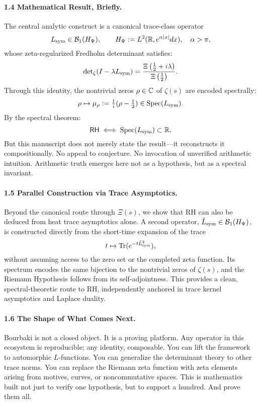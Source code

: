 \paragraph*{1.4 Mathematical Result, Briefly.}
The central analytic construct is a canonical trace-class operator
\[
L_{\mathrm{sym}} \in \mathcal{B}_1(H_{\Psi}), \qquad H_{\Psi} := L^2(\mathbb{R}, e^{\alpha|x|} dx), \quad \alpha > \pi,
\]
whose zeta-regularized Fredholm determinant satisfies:
\[
\det\nolimits_{\zeta}(I - \lambda L_{\mathrm{sym}}) = \frac{\Xi\left(\tfrac{1}{2} + i\lambda\right)}{\Xi\left(\tfrac{1}{2}\right)}.
\]
Through this identity, the nontrivial zeros \( \rho \in \mathbb{C} \) of \( \zeta(s) \) are encoded spectrally:
\[
\rho \mapsto \mu_\rho := \tfrac{1}{i}(\rho - \tfrac{1}{2}) \in \operatorname{Spec}(L_{\mathrm{sym}}).
\]
By the spectral theorem:
\[
\mathsf{RH} \iff \operatorname{Spec}(L_{\mathrm{sym}}) \subset \mathbb{R}.
\]
But this manuscript does not merely state the result—it reconstructs it compositionally. No appeal to conjecture. No invocation of unverified arithmetic intuition. Arithmetic truth emerges here not as a hypothesis, but as a spectral invariant.

\paragraph*{1.5 Parallel Construction via Trace Asymptotics.}
Beyond the canonical route through \( \Xi(s) \), we show that RH can also be deduced from heat trace asymptotics alone. A second operator, \( \tilde{L}_{\mathrm{sym}} \in \mathcal{B}_1(H_{\Psi}) \), is constructed directly from the short-time expansion of the trace
\[
t \mapsto \operatorname{Tr}(e^{-t \tilde{L}_{\mathrm{sym}}^2}),
\]
without assuming access to the zero set or the completed zeta function. Its spectrum encodes the same bijection to the nontrivial zeros of \( \zeta(s) \), and the Riemann Hypothesis follows from its self-adjointness. This provides a clean, spectral-theoretic route to RH, independently anchored in trace kernel asymptotics and Laplace duality.

\paragraph*{1.6 The Shape of What Comes Next.}
Bourbaki is not a closed object. It is a proving platform. Any operator in this ecosystem is reproducible; any identity, composable. You can lift the framework to automorphic \( L \)-functions. You can generalize the determinant theory to other trace norms. You can replace the Riemann zeta function with zeta elements arising from motives, curves, or noncommutative spaces. This is mathematics built not just to verify one hypothesis, but to support a hundred. And prove them all.

